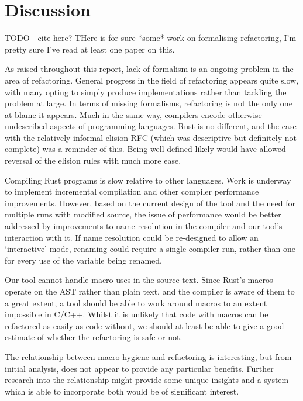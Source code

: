 \section{Discussion}

TODO - cite here? THere is for sure *some* work on formalising refactoring, I'm pretty sure I've read at least one paper on this.

As raised throughout this report, lack of formalism is an ongoing problem in the area of refactoring. General progress in the field of refactoring appears quite slow, with many opting to simply produce implementations rather than tackling the problem at large. In terms of missing formalisms, refactoring is not the only one at blame it appears. Much in the same way, compilers encode otherwise undescribed aspects of programming languages. Rust is no different, and the case with the relatively informal elision RFC (which was descriptive but definitely not complete) was a reminder of this. Being well-defined likely would have allowed reversal of the elision rules with much more ease.

Compiling Rust programs is slow relative to other languages. Work is underway to implement incremental compilation and other compiler performance improvements. However, based on the current design of the tool and the need for multiple runs with modified source, the issue of performance would be better addressed by improvements to name resolution in the compiler and our tool's interaction with it. If name resolution could be re-designed to allow an `interactive' mode, renaming could require a single compiler run, rather than one for every use of the variable being renamed.

Our tool cannot handle macro uses in the source text. Since Rust's macros operate on the AST rather than plain text, and the compiler is aware of them to a great extent, a tool should be able to work around macros to an extent impossible in C/C++. Whilst it is unlikely that code with macros can be refactored as easily as code without, we should at least be able to give a good estimate of whether the refactoring is safe or not. 

The relationship between macro hygiene and refactoring is interesting, but from initial analysis, does not appear to provide any particular benefits. Further research into the relationship might provide some unique insights and a system which is able to incorporate both would be of significant interest.
